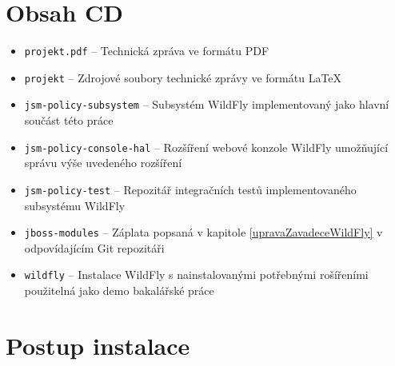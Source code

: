 \chapter{Obsah CD}

\begin{itemize}
  \item {\tt projekt.pdf} -- Technická zpráva ve formátu PDF
  \item {\tt projekt} -- Zdrojové soubory technické zprávy ve formátu \LaTeX
  
  \item {\tt jsm-policy-subsystem} -- Subsystém WildFly implementovaný jako hlavní součást této práce
  \item {\tt jsm-policy-console-hal} -- Rozšíření webové konzole WildFly umožňující správu výše uvedeného rozšíření
  \item {\tt jsm-policy-test} -- Repozitář integračních testů implementovaného subsystému WildFly
  
  \item {\tt jboss-modules} -- Záplata popsaná v kapitole \ref{upravaZavadeceWildFly} v odpovídajícím Git repozitáři
  
  \item {\tt wildfly} -- Instalace WildFly s nainstalovanými potřebnými rošířeními použitelná jako demo bakalářské práce
  
\end{itemize}


\chapter{Postup instalace}

